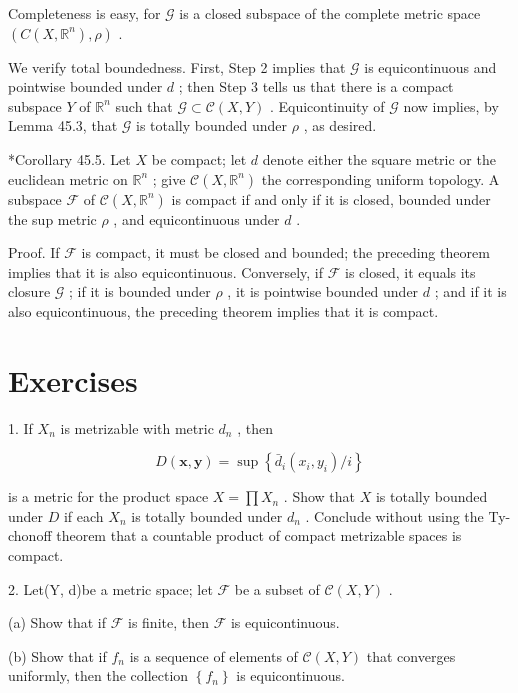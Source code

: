 Completeness is easy, for \(\mathcal{G}\) is a closed subspace of the complete metric space \(\left( {C\left( {X,{\mathbb{R}}^{n}}\right) ,\rho }\right)\) .

We verify total boundedness. First, Step 2 implies that \(\mathcal{G}\) is equicontinuous and pointwise bounded under \(d\) ; then Step 3 tells us that there is a compact subspace \(Y\) of \({\mathbb{R}}^{n}\) such that \(\mathcal{G} \subset  \mathcal{C}\left( {X,Y}\right)\) . Equicontinuity of \(\mathcal{G}\) now implies, by Lemma 45.3, that \(\mathcal{G}\) is totally bounded under \(\rho\) , as desired.

*Corollary 45.5. Let \(X\) be compact; let \(d\) denote either the square metric or the euclidean metric on \({\mathbb{R}}^{n}\) ; give \(\mathcal{C}\left( {X,{\mathbb{R}}^{n}}\right)\) the corresponding uniform topology. A subspace \(\mathcal{F}\) of \(\mathcal{C}\left( {X,{\mathbb{R}}^{n}}\right)\) is compact if and only if it is closed, bounded under the sup metric \(\rho\) , and equicontinuous under \(d\) .

Proof. If \(\mathcal{F}\) is compact, it must be closed and bounded; the preceding theorem implies that it is also equicontinuous. Conversely, if \(\mathcal{F}\) is closed, it equals its closure \(\mathcal{G}\) ; if it is bounded under \(\rho\) , it is pointwise bounded under \(d\) ; and if it is also equicontinuous, the preceding theorem implies that it is compact.

\section*{Exercises}

1. If \({X}_{n}\) is metrizable with metric \({d}_{n}\) , then

\[
D\left( {\mathbf{x},\mathbf{y}}\right)  = \sup \left\{  {{\bar{d}}_{i}\left( {{x}_{i},{y}_{i}}\right) /i}\right\}
\]

is a metric for the product space \(X = \prod {X}_{n}\) . Show that \(X\) is totally bounded under \(D\) if each \({X}_{n}\) is totally bounded under \({d}_{n}\) . Conclude without using the Ty-chonoff theorem that a countable product of compact metrizable spaces is compact.

2. Let(Y, d)be a metric space; let \(\mathcal{F}\) be a subset of \(\mathcal{C}\left( {X,Y}\right)\) .

(a) Show that if \(\mathcal{F}\) is finite, then \(\mathcal{F}\) is equicontinuous.

(b) Show that if \({f}_{n}\) is a sequence of elements of \(\mathcal{C}\left( {X,Y}\right)\) that converges uniformly, then the collection \(\left\{  {f}_{n}\right\}\) is equicontinuous.

